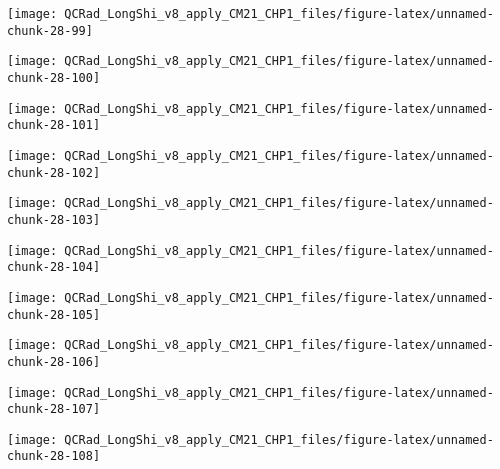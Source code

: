 \documentclass[
  10pt,
  a4paper,oneside]{article}
\begin{document}
\begin{center}\texttt{[image: QCRad\_LongShi\_v8\_apply\_CM21\_CHP1\_files/figure-latex/unnamed-chunk-28-99]} \end{center}

\begin{center}\texttt{[image: QCRad\_LongShi\_v8\_apply\_CM21\_CHP1\_files/figure-latex/unnamed-chunk-28-100]} \end{center}

\begin{center}\texttt{[image: QCRad\_LongShi\_v8\_apply\_CM21\_CHP1\_files/figure-latex/unnamed-chunk-28-101]} \end{center}

\begin{center}\texttt{[image: QCRad\_LongShi\_v8\_apply\_CM21\_CHP1\_files/figure-latex/unnamed-chunk-28-102]} \end{center}

\begin{center}\texttt{[image: QCRad\_LongShi\_v8\_apply\_CM21\_CHP1\_files/figure-latex/unnamed-chunk-28-103]} \end{center}

\begin{center}\texttt{[image: QCRad\_LongShi\_v8\_apply\_CM21\_CHP1\_files/figure-latex/unnamed-chunk-28-104]} \end{center}

\begin{center}\texttt{[image: QCRad\_LongShi\_v8\_apply\_CM21\_CHP1\_files/figure-latex/unnamed-chunk-28-105]} \end{center}

\begin{center}\texttt{[image: QCRad\_LongShi\_v8\_apply\_CM21\_CHP1\_files/figure-latex/unnamed-chunk-28-106]} \end{center}

\begin{center}\texttt{[image: QCRad\_LongShi\_v8\_apply\_CM21\_CHP1\_files/figure-latex/unnamed-chunk-28-107]} \end{center}

\begin{center}\texttt{[image: QCRad\_LongShi\_v8\_apply\_CM21\_CHP1\_files/figure-latex/unnamed-chunk-28-108]} \end{center}
\end{document}
